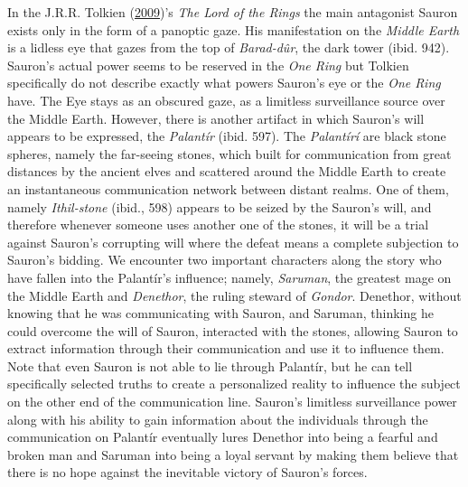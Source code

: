 \documentclass[12pt,twoside]{report}
\begin{document}
In the J.R.R. Tolkien (\protect\hyperlink{ref-Tolkien2009}{2009})'s \emph{The Lord of the Rings} the main antagonist Sauron exists only in the form of a panoptic gaze. His manifestation on the \emph{Middle Earth} is a lidless eye that gazes from the top of \emph{Barad-dûr}, the dark tower (ibid. 942). Sauron's actual power seems to be reserved in the \emph{One Ring} but Tolkien specifically do not describe exactly what powers Sauron's eye or the \emph{One Ring} have. The Eye stays as an obscured gaze, as a limitless surveillance source over the Middle Earth. However, there is another artifact in which Sauron's will appears to be expressed, the \emph{Palantír} (ibid. 597). The \emph{Palantírí} are black stone spheres, namely the far-seeing stones, which built for communication from great distances by the ancient elves and scattered around the Middle Earth to create an instantaneous communication network between distant realms. One of them, namely \emph{Ithil-stone} (ibid., 598) appears to be seized by the Sauron's will, and therefore whenever someone uses another one of the stones, it will be a trial against Sauron's corrupting will where the defeat means a complete subjection to Sauron's bidding. We encounter two important characters along the story who have fallen into the Palantír's influence; namely, \emph{Saruman}, the greatest mage on the Middle Earth and \emph{Denethor}, the ruling steward of \emph{Gondor}. Denethor, without knowing that he was communicating with Sauron, and Saruman, thinking he could overcome the will of Sauron, interacted with the stones, allowing Sauron to extract information through their communication and use it to influence them. Note that even Sauron is not able to lie through Palantír, but he can tell specifically selected truths to create a personalized reality to influence the subject on the other end of the communication line. Sauron's limitless surveillance power along with his ability to gain information about the individuals through the communication on Palantír eventually lures Denethor into being a fearful and broken man and Saruman into being a loyal servant by making them believe that there is no hope against the inevitable victory of Sauron's forces.
\end{document}
